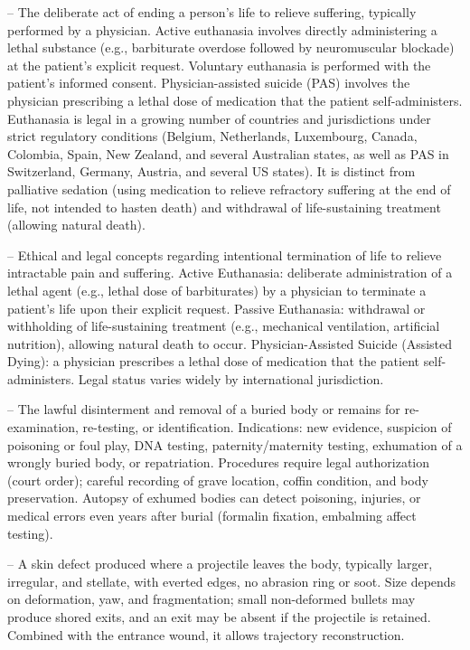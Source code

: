 -- The deliberate act of ending a person's life to relieve suffering, typically performed by a physician. Active euthanasia involves directly administering a lethal substance (e.g., barbiturate overdose followed by neuromuscular blockade) at the patient's explicit request. Voluntary euthanasia is performed with the patient's informed consent. Physician-assisted suicide (PAS) involves the physician prescribing a lethal dose of medication that the patient self-administers. Euthanasia is legal in a growing number of countries and jurisdictions under strict regulatory conditions (Belgium, Netherlands, Luxembourg, Canada, Colombia, Spain, New Zealand, and several Australian states, as well as PAS in Switzerland, Germany, Austria, and several US states). It is distinct from palliative sedation (using medication to relieve refractory suffering at the end of life, not intended to hasten death) and withdrawal of life-sustaining treatment (allowing natural death).

-- Ethical and legal concepts regarding intentional termination of life to relieve intractable pain and suffering. Active Euthanasia: deliberate administration of a lethal agent (e.g., lethal dose of barbiturates) by a physician to terminate a patient's life upon their explicit request. Passive Euthanasia: withdrawal or withholding of life-sustaining treatment (e.g., mechanical ventilation, artificial nutrition), allowing natural death to occur. Physician-Assisted Suicide (Assisted Dying): a physician prescribes a lethal dose of medication that the patient self-administers. Legal status varies widely by international jurisdiction.

-- The lawful disinterment and removal of a buried body or remains for re-examination, re-testing, or identification. Indications: new evidence, suspicion of poisoning or foul play, DNA testing, paternity/maternity testing, exhumation of a wrongly buried body, or repatriation. Procedures require legal authorization (court order); careful recording of grave location, coffin condition, and body preservation. Autopsy of exhumed bodies can detect poisoning, injuries, or medical errors even years after burial (formalin fixation, embalming affect testing).

-- A skin defect produced where a projectile leaves the body, typically larger, irregular, and stellate, with everted edges, no abrasion ring or soot. Size depends on deformation, yaw, and fragmentation; small non-deformed bullets may produce shored exits, and an exit may be absent if the projectile is retained. Combined with the entrance wound, it allows trajectory reconstruction.

